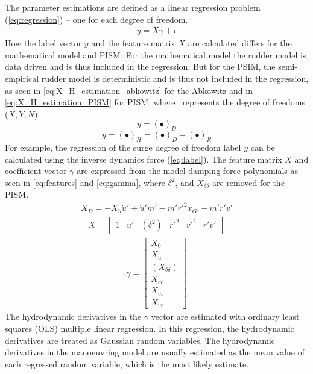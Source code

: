 The parameter estimations are defined as a linear regression problem (\autoref{eq:regression}) -- one for each degree of freedom. 
\begin{equation}\label{eq:regression}
\begin{split}y = X\gamma + \epsilon\end{split}
\end{equation}
How the label vector \(y\) and the feature matrix \(X\) are calculated differs for the mathematical model and PISM; For the mathematical model the rudder model is data driven and is thus included in the regression; But for the PSIM, the semi-empirical rudder model is deterministic and is thus not included in the regression, as seen in \autoref{eq:X_H_estimation_abkowitz} for the Abkowitz and in \autoref{eq:X_H_estimation_PISM} for PISM, where \textbullet\ represents the degree of freedoms ($X,Y,N$).
\begin{equation}
    \label{eq:X_H_estimation_abkowitz}
    y = (\bullet)_D
\end{equation}
\begin{equation}
    \label{eq:X_H_estimation_PISM}
    y = (\bullet)_H = (\bullet)_D - (\bullet)_R
\end{equation}
For example, the regression of the surge degree of freedom label \(y\) can be calculated using the inverse dynamics force (\autoref{eq:label}). 
The feature matrix \(X\) and coefficient vector $\gamma$ are expressed from the model damping force polynomials as seen in \autoref{eq:features} and \autoref{eq:gamma}, where $\delta^2$, and $X_{\delta\delta}$ are removed for the PISM.
\begin{equation}\label{eq:label}
\begin{split}\displaystyle X_D = - X_{\dot{u}} \dot{u}' + \dot{u}' m' - m' r'^{2} x_{G'} - m' r' v'\end{split}
\end{equation}
\begin{equation}\label{eq:features}
\begin{split}\displaystyle X = \left[\begin{matrix}1 & u' & (\delta^{2}) & r'^{2} & v'^{2} & r' v'\end{matrix}\right]\end{split}
\end{equation}
\begin{equation}\label{eq:gamma}
\begin{split}\displaystyle \gamma = \left[\begin{matrix}X_{0}\\X_{u}\\(X_{\delta\delta})\\X_{rr}\\X_{vv}\\X_{vr}\end{matrix}\right]\end{split}
\end{equation}
The hydrodynamic derivatives in the \(\gamma\) vector are estimated with ordinary least squares (OLS) multiple linear regression.
In this regression, the hydrodynamic derivatives are treated as Gaussian random variables. The hydrodynamic derivatives in the manoeuvring model are usually estimated as the mean value of each regressed random variable, which is the most likely estimate.